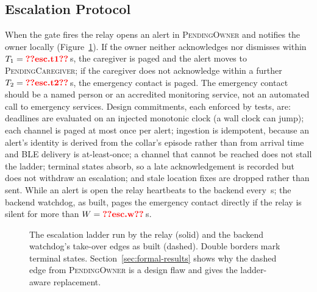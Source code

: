 \subsection{Escalation Protocol}
\label{sec:ladder}
When the gate fires the relay opens an alert in \textsc{PendingOwner} and notifies the owner locally (Figure~\ref{fig:sm}). If the owner neither acknowledges nor dismisses within $T_1=\R{esc.t1}$\,s, the caregiver is paged and the alert moves to \textsc{PendingCaregiver}; if the caregiver does not acknowledge within a further $T_2=\R{esc.t2}$\,s, the emergency contact is paged. The emergency contact should be a named person or an accredited monitoring service, not an automated call to emergency services. Design commitments, each enforced by tests, are: deadlines are evaluated on an injected monotonic clock (a wall clock can jump); each channel is paged at most once per alert; ingestion is idempotent, because an alert's identity is derived from the collar's episode rather than from arrival time and BLE delivery is at-least-once; a channel that cannot be reached does not stall the ladder; terminal states absorb, so a late acknowledgement is recorded but does not withdraw an escalation; and stale location fixes are dropped rather than sent. While an alert is open the relay heartbeats to the backend every \,s; the backend watchdog, as built, pages the emergency contact directly if the relay is silent for more than $W=\R{esc.w}$\,s.

\begin{figure}[H]
\centering
\resizebox{\linewidth}{!}{}
\caption{The escalation ladder run by the relay (solid) and the backend watchdog's take-over edges as built (dashed). Double borders mark terminal states. Section~\ref{sec:formal-results} shows why the dashed edge from \textsc{PendingOwner} is a design flaw and gives the ladder-aware replacement.\label{fig:sm}}
\end{figure}

